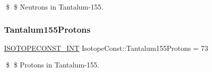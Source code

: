 \$ \$ Neutrons in Tantalum-\/155. \mbox{\label{group___isotope_const-_tantalum-_ta155_ga9446f83937d0f59177cbae4de241c7f4}} 
\subsubsection{\texorpdfstring{Tantalum155\+Protons}{Tantalum155Protons}}
{\footnotesize\ttfamily \mbox{\hyperlink{group___isotope_const-_macros_ga5f18360b3e99483a35c32d789e62621c}{I\+S\+O\+T\+O\+P\+E\+C\+O\+N\+S\+T\+\_\+\+I\+NT}} Isotope\+Const\+::\+Tantalum155\+Protons = 73}

\$ \$ Protons in Tantalum-\/155. 